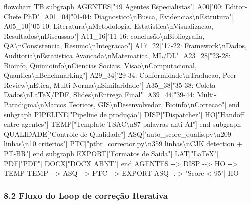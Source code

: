 \documentclass[
  12pt,
]{article}
\newenvironment{Shaded}{}{}
\newcommand{\NormalTok}[1]{#1}
\begin{document}
\begin{Shaded}
\begin{Highlighting}[]
\NormalTok{flowchart TB}
\NormalTok{subgraph AGENTES["49 Agentes Especialistas"]}
\NormalTok{A00["00: Editor{-}Chefe PhD"]}
\NormalTok{A01\_04["01{-}04: Diagnostico\textbackslash{}nBusca, Evidencias\textbackslash{}nEstrutura"]}
\NormalTok{A05\_10["05{-}10: Literatura\textbackslash{}nMetodologia, Estatistica\textbackslash{}nVisualizacao, Resultados\textbackslash{}nDiscussao"]}
\NormalTok{A11\_16["11{-}16: conclusão\textbackslash{}nBibliografia, QA\textbackslash{}nConsistencia, Resumo\textbackslash{}nIntegracao"]}
\NormalTok{A17\_22["17{-}22: Framework\textbackslash{}nDados, Auditoria\textbackslash{}nEstatistica Avancada\textbackslash{}nMatematica, ML/DL"]}
\NormalTok{A23\_28["23{-}28: Bioinfo, Quimioinfo\textbackslash{}nCiencias Sociais, Visao\textbackslash{}nComputacional, Quantica\textbackslash{}nBenchmarking"]}
\NormalTok{A29\_34["29{-}34: Conformidade\textbackslash{}nTraducao, Peer Review\textbackslash{}nEtica, Multi{-}Norma\textbackslash{}nSimilaridade"]}
\NormalTok{A35\_38["35{-}38: Coleta Dados\textbackslash{}nLaTeX/PDF, Slides\textbackslash{}nEntrega Final"]}
\NormalTok{A39\_44["39{-}44: Multi{-}Paradigma\textbackslash{}nMarcos Teoricos, GIS\textbackslash{}nDesenvolvedor, Bioinfo\textbackslash{}nCorrecao"]}
\NormalTok{end}
\NormalTok{subgraph PIPELINE["Pipeline de produção"]}
\NormalTok{DISP["Dispatcher"]}
\NormalTok{HO["Handoff entre agentes"]}
\NormalTok{TEMP["Template TSAC\textbackslash{}n87 palavras anti{-}AI"]}
\NormalTok{end}
\NormalTok{subgraph QUALIDADE["Controle de Qualidade"]}
\NormalTok{ASQ["auto\_score\_qualis.py\textbackslash{}n209 linhas\textbackslash{}n10 criterios"]}
\NormalTok{PTC["ptbr\_corrector.py\textbackslash{}n359 linhas\textbackslash{}nCJK detection + PT{-}BR"]}
\NormalTok{end}
\NormalTok{subgraph EXPORT["Formatos de Saida"]}
\NormalTok{LAT["LaTeX"]}
\NormalTok{PDF["PDF"]}
\NormalTok{DOCX["DOCX ABNT"]}
\NormalTok{end}
\NormalTok{AGENTES {-}{-}\textgreater{} DISP {-}{-}\textgreater{} HO {-}{-}\textgreater{} TEMP}
\NormalTok{TEMP {-}{-}\textgreater{} ASQ {-}{-}\textgreater{} PTC {-}{-}\textgreater{} EXPORT}
\NormalTok{ASQ {-}.{-}\textgreater{}|"Score \textless{} 95"| HO}
\end{Highlighting}
\end{Shaded}

\subsubsection{8.2 Fluxo do Loop de correção
Iterativa}\label{fluxo-do-loop-de-correuxe7uxe3o-iterativa}
\end{document}
